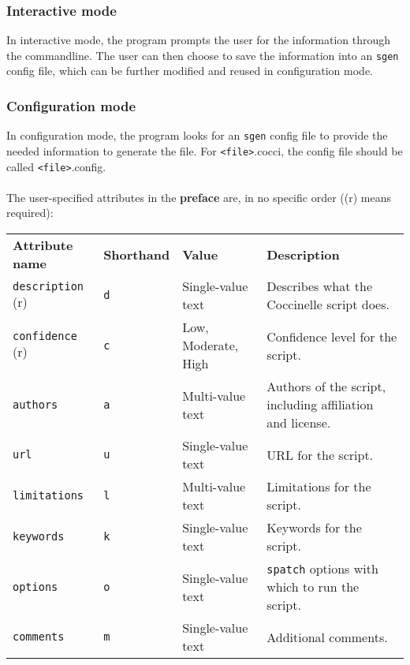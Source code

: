 \subsubsection{Interactive mode\label{interact}}
In interactive mode, the program prompts the user for the information through the commandline. The user can then choose to save the information into an \texttt{sgen} config file, which can be further modified and reused in configuration mode.
\bigskip

\subsubsection{Configuration mode\label{config}}
In configuration mode, the program looks for an \texttt{sgen} config file to provide the needed information to generate the file. For \texttt{<file>}.cocci, the config file should be called \texttt{<file>}.config.\\\\
The user-specified attributes in the \textbf{preface} are, in no specific order ((r) means required):
\begin{center}
\renewcommand{\arraystretch}{1.2}
\begin{tabular}{p{3cm}p{2.1cm}p{3.6cm}p{5.5cm}}
\textbf{Attribute name} & \textbf{Shorthand} & \textbf{Value} & \textbf{Description}\\
\texttt{description} (r) & \texttt{d} & Single-value text & Describes what the Coccinelle script does.\\
\texttt{confidence} (r) & \texttt{c} & Low, Moderate, High & Confidence level for the script.\\
\texttt{authors} & \texttt{a} & Multi-value text & Authors of the script, including affiliation and license.\\
\texttt{url} & \texttt{u} & Single-value text & URL for the script.\\
\texttt{limitations} & \texttt{l} & Multi-value text & Limitations for the script.\\
\texttt{keywords} & \texttt{k} & Single-value text & Keywords for the script.\\
\texttt{options} & \texttt{o} & Single-value text &\texttt{spatch} options with which to run the script.\\
\texttt{comments} & \texttt{m} & Single-value text & Additional comments.\\
\end{tabular}
\end{center}\vspace{0.5cm}
